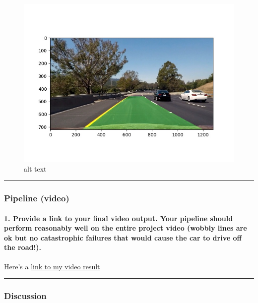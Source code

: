 \documentclass[11pt]{article}
\makeatletter
\def\maxwidth{\ifdim\Gin@nat@width>\linewidth\linewidth
    \else\Gin@nat@width\fi}
\let\Oldincludegraphics\includegraphics
\renewcommand{\includegraphics}[1]{\Oldincludegraphics[width=.8\maxwidth]{#1}}
\makeatother
\begin{document}
\begin{figure}
\centering
\includegraphics{./output_images/Warp_back/map_lane_test6.jpg}
\caption{alt text}
\end{figure}

\begin{center}\rule{0.5\linewidth}{\linethickness}\end{center}

\subsubsection{Pipeline (video)}\label{pipeline-video}

\paragraph{1. Provide a link to your final video output. Your pipeline
should perform reasonably well on the entire project video (wobbly lines
are ok but no catastrophic failures that would cause the car to drive
off the
road!).}\label{provide-a-link-to-your-final-video-output.-your-pipeline-should-perform-reasonably-well-on-the-entire-project-video-wobbly-lines-are-ok-but-no-catastrophic-failures-that-would-cause-the-car-to-drive-off-the-road.}

Here's a \href{./project_video.mp4}{link to my video result}

\begin{center}\rule{0.5\linewidth}{\linethickness}\end{center}

\subsubsection{Discussion}\label{discussion}
\end{document}
